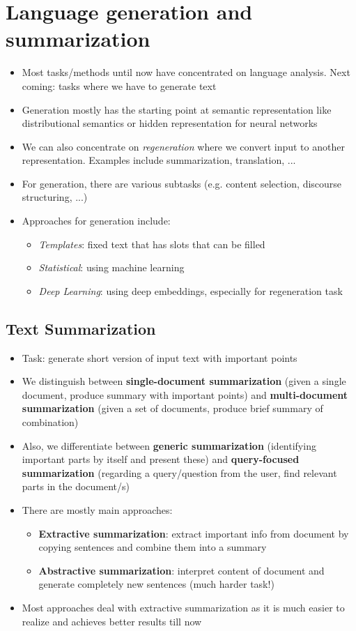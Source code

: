 \section{Language generation and summarization}
\begin{itemize}
	\item Most tasks/methods until now have concentrated on language analysis. Next coming: tasks where we have to generate text
	\item Generation mostly has the starting point at semantic representation like distributional semantics or hidden representation for neural networks
	\item We can also concentrate on \textit{regeneration} where we convert input to another representation. Examples include summarization, translation, ...
	\item For generation, there are various subtasks (e.g. content selection, discourse structuring, ...)
	\item Approaches for generation include:
	\begin{itemize}
		\item \textit{Templates}: fixed text that has slots that can be filled
		\item \textit{Statistical}: using machine learning
		\item \textit{Deep Learning}: using deep embeddings, especially for regeneration task
	\end{itemize}
\end{itemize}
\subsection{Text Summarization}
\begin{itemize}
	\item Task: generate short version of input text with important points
	\item We distinguish between \textbf{single-document summarization} (given a single document, produce summary with important points) and \textbf{multi-document summarization} (given a set of documents, produce brief summary of combination)
	\item Also, we differentiate between \textbf{generic summarization} (identifying important parts by itself and present these) and \textbf{query-focused summarization} (regarding a query/question from the user, find relevant parts in the document/s)
	\item There are mostly main approaches:
	\begin{itemize}
		\item \textbf{Extractive summarization}: extract important info from document by copying sentences and combine them into a summary
		\item \textbf{Abstractive summarization}: interpret content of document and generate completely new sentences (much harder task!)
	\end{itemize}
	\item Most approaches deal with extractive summarization as it is much easier to realize and achieves better results till now
\end{itemize}
